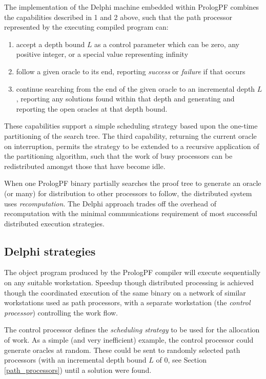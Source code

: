 The implementation of the Delphi machine embedded within PrologPF combines the
capabilities described in 1 and 2 above, such that the path processor represented
by the executing compiled program can:
\begin{enumerate}
\item{accept a depth bound $L$ as a control parameter which can be zero, any
  positive integer, or a special value representing infinity}
\item{follow a given oracle to its end, reporting \textit{success} or
  \textit{failure} if that occurs}
\item{continue searching from the end of the given oracle to an incremental
  depth $L$, reporting any solutions found within that depth and generating
  and reporting the open oracles at that depth bound.}
\end{enumerate}

These capabilities support a simple scheduling strategy based upon the
one-time partitioning of the search tree.  The third capability, returning
the current oracle on interruption, permits the strategy to be extended
to a recursive application of the partitioning algorithm, such that
the work of busy processors can be redistributed amongst
those that have become idle.

When one PrologPF binary partially searches the proof tree to generate
an oracle (or many) for distribution to other processors to follow,
the distributed system uses \textit{recomputation}.
The Delphi approach trades off the overhead of recomputation with the minimal
communications requirement of most successful distributed execution
strategies.

\subsection{Delphi strategies}
\label{delphi_strategies}

The object program produced by the PrologPF compiler will execute sequentially on
any suitable workstation.  Speedup though distributed processing is
achieved though the coordinated execution of the same binary on a network
of similar workstations used as path processors, with a separate
workstation (the \textit{control processor}) controlling the work flow.

The control processor defines the \textit{scheduling strategy} to be used for
the allocation of work.
As a simple (and very inefficient) example, the control processor could
generate oracles at random.  These could be sent to randomly selected
path processors (with an incremental depth bound $L$ of 0, see Section
\ref{path_processors}) until a solution were found.

